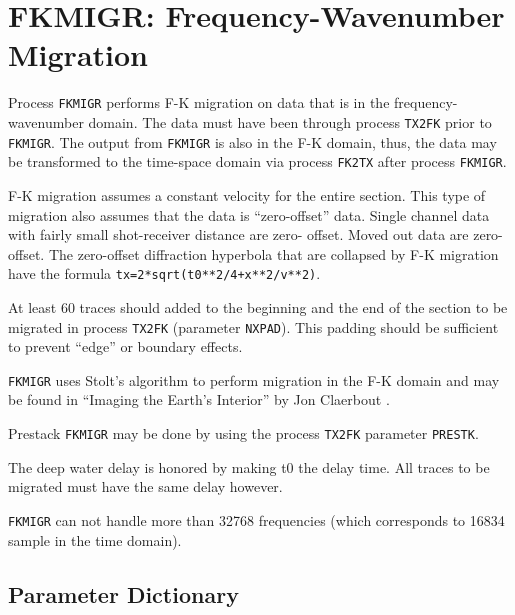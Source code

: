 \section{FKMIGR: Frequency-Wavenumber Migration}
\label{cmd_fkmigr}

Process \texttt{FKMIGR} performs F-K migration on data that is in the frequency-
wavenumber domain.  The data must have been through process \texttt{TX2FK} prior
to \texttt{FKMIGR}.  The output from \texttt{FKMIGR} is also in the F-K domain, thus, the
data may be transformed to the time-space domain via process \texttt{FK2TX} after
process \texttt{FKMIGR}.

F-K migration assumes a constant velocity for the entire section. This
type of migration also assumes that the data is ``zero-offset'' data.
Single channel data with fairly small shot-receiver distance are zero-
offset.  Moved out data are zero-offset.  The zero-offset diffraction
hyperbola that are collapsed by F-K migration  have the formula
\texttt{tx=2*sqrt(t0**2/4+x**2/v**2)}.

At least 60 traces should added to the beginning and the end of the
section to be migrated in process \texttt{TX2FK} (parameter \texttt{NXPAD}).  This padding
should be sufficient to prevent ``edge'' or boundary effects.

\texttt{FKMIGR} uses Stolt's algorithm to perform migration in the F-K domain and
may be found in ``Imaging the Earth's Interior'' by Jon Claerbout \cite{Claerbout1985}.

Prestack \texttt{FKMIGR} may be done by using the process \texttt{TX2FK} parameter \texttt{PRESTK}.

The deep water delay is honored by making t0 the delay time.  All traces
to be migrated must have the same delay however.

\texttt{FKMIGR} can not handle more than 32768 frequencies (which corresponds to
16834 sample in the time domain).

\subsection{Parameter Dictionary}

